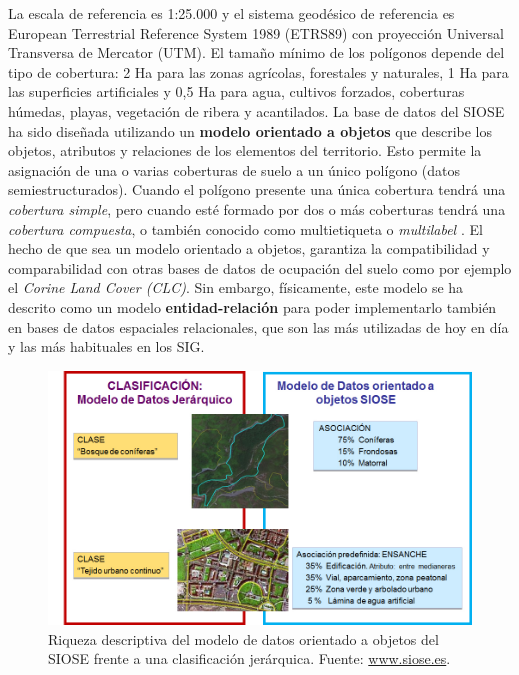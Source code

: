 La escala de referencia es 1:25.000 y el sistema geodésico de referencia es European Terrestrial Reference System 1989 (ETRS89) con proyección Universal Transversa de Mercator (UTM). El tamaño mínimo de los polígonos depende del tipo de cobertura: 2 Ha para las zonas agrícolas, forestales y naturales, 1 Ha para las superficies artificiales y 0,5 Ha para agua, cultivos forzados, coberturas húmedas, playas, vegetación de ribera y acantilados. La base de datos del SIOSE ha sido diseñada utilizando un \textbf{modelo orientado a objetos} que describe los objetos, atributos y relaciones de los elementos del territorio. Esto permite la asignación de una o varias coberturas de suelo a un único polígono (datos semiestructurados). Cuando el polígono presente una única cobertura tendrá una \textit{cobertura simple}, pero cuando esté formado por dos o más coberturas tendrá una \textit{cobertura compuesta}, o también conocido como multietiqueta o \textit{multilabel} \citep{EquipoTecnicoNacionalSIOSE2015}. El hecho de que sea un modelo orientado a objetos, garantiza la compatibilidad y comparabilidad con otras bases de datos de ocupación del suelo como por ejemplo el \textit{Corine Land Cover (CLC)}. Sin embargo, físicamente, este modelo se ha descrito como un modelo \textbf{entidad-relación} para poder implementarlo también en bases de datos espaciales relacionales, que son las más utilizadas de hoy en día y las más habituales en los SIG.

\begin{figure}
\includegraphics[width=\textwidth]{Introduccion/Figs/siose-oo.png}
\caption{Riqueza descriptiva del modelo de datos orientado a objetos del SIOSE frente a una clasificación jerárquica. Fuente: \url{www.siose.es}.\label{fig:siose-oo}}
\end{figure}

